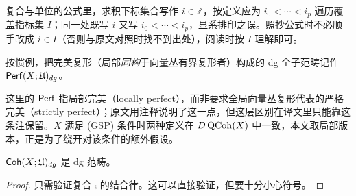 \begin{yizhu}
复合与单位的公式里，求积下标集合写作 $i\in\mathbb{Z}$，按定义应为 $i_0<\cdots<i_p$ 遍历覆盖指标集 $I$；同一处既写 $i$ 又写 $i_0<\cdots<i_p$，显系排印之误。照抄公式时不必顺手改成 $i\in I$（否则与原文对照时找不到出处），阅读时按 $I$ 理解即可。
\end{yizhu}

按惯例，把完美复形（局部\emph{同构}于向量丛有界复形者）构成的 dg 全子范畴记作 $\operatorname{\mathsf{Perf}} (X;\mathfrak{U})_{dg}$。

\begin{yizhu}
这里的 $\operatorname{\mathsf{Perf}}$ 指局部完美（locally perfect），而非要求全局向量丛复形代表的严格完美（strictly perfect）；原文用注释说明了这一点，但这层区别在译文里只能靠这条注保留。$X$ 满足 (GSP) 条件时两种定义在 $D\operatorname{\mathrm{QCoh}}(X)$ 中一致，本文取局部版本，正是为了绕开对该条件的额外假设。
\end{yizhu}

\begin{prp}\label{prp:verifying-dg}
    $\operatorname{\mathsf{Coh}} (X;\mathfrak{U})_{dg}$ 是 dg 范畴。
\end{prp}
\begin{proof}
    只需验证复合 $\comp$ 的结合律。这可以直接验证，但要十分小心符号。
\end{proof}

